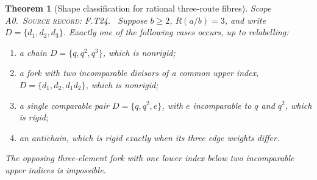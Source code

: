 \documentclass[11pt,oneside,openany]{book}
\newtheorem{theorem}{Theorem}[chapter]
\theoremstyle{definition}
\theoremstyle{remark}
\newcommand{\scope}[1]{\textsf{\small Scope #1.}\ }
\newcommand{\record}[1]{\textup{\textsc{Source record: #1.}}\ }
\begin{document}
\begin{theorem}[Shape classification for rational three-route fibres]\label{thm:shape}
\scope{A0}\record{F.T24} Suppose \(b\ge2\), \(R(a/b)=3\), and write \(D=\{d_1,d_2,d_3\}\). Exactly one of the following cases occurs, up to relabelling:
\begin{enumerate}[label=\textup{(\roman*)}]
\item a chain \(D=\{q,q^2,q^3\}\), which is nonrigid;
\item a fork with two incomparable divisors of a common upper index, \(D=\{d_1,d_2,d_1d_2\}\), which is nonrigid;
\item a single comparable pair \(D=\{q,q^2,e\}\), with \(e\) incomparable to \(q\) and \(q^2\), which is rigid;
\item an antichain, which is rigid exactly when its three edge weights differ.
\end{enumerate}
The opposing three-element fork with one lower index below two incomparable upper indices is impossible.
\end{theorem}
\end{document}
